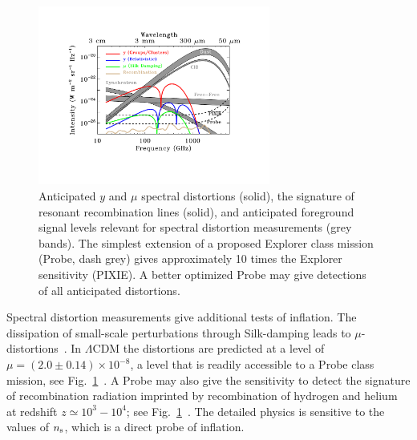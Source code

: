 \begin{figure}[ht!]
\hspace{-0.2in}
\parbox{4.0in}{\centerline {
\includegraphics[width=3.0in]{Figures/probe_spectral_foregrounds_v3.pdf} } }
\hspace{-0.05in}
\parbox{2.5in}{
\caption{ \small \setlength{\baselineskip}{0.95\baselineskip}
Anticipated $y$ and $\mu$ spectral distortions (solid), the signature of resonant recombination lines (solid), and anticipated foreground 
signal levels relevant for spectral distortion measurements (grey bands). 
The simplest extension of a proposed
Explorer class mission (Probe, dash grey) gives approximately 10 times the Explorer sensitivity (PIXIE). 
A better optimized Probe may give detections of all anticipated distortions. 
\label{fig:distortions} } }
\vspace{-0.1in}
\end{figure}

Spectral distortion measurements give additional tests of inflation. The dissipation of small-scale 
perturbations through Silk-damping leads to $\mu$-distortions~\cite{Sunyaev1970diss, Daly1991, Hu1994, Chluba2012}. 
In $\Lambda$CDM the distortions are predicted at a level of $\mu=(2.0\pm0.14)\times 10^{-8}$, a level that 
is readily accessible to a Probe class mission, see Fig.~\ref{fig:distortions}~\cite{Chluba2012, Chluba2016LCDM}. 
A Probe may also give the sensitivity to detect the signature of recombination 
radiation imprinted by recombination of hydrogen and helium 
at redshift $z\simeq 10^3-10^4$; see Fig.~\ref{fig:distortions}~\citep{Sunyaev2009, Chluba2016}. 
The detailed physics is sensitive to the values of $n_{\rm s}$, which is a direct probe of inflation. 



